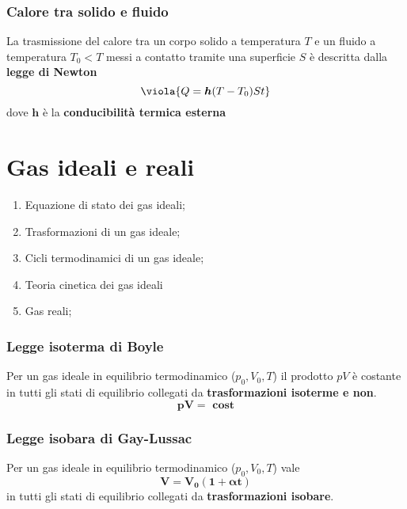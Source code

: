 \subsection{Calore tra solido e fluido}
La trasmissione del calore tra un corpo solido a temperatura \(T\) e un fluido a temperatura \(T_0 < T\) messi a contatto tramite una superficie \(S\) è descritta dalla \textbf{legge di Newton}
\begin{equation}
	\viola{Q = \boldsymbol{h}(T-T_0)St}
\end{equation}
dove \(\boldsymbol{h}\) è la \textbf{conducibilità termica esterna}

\newpage
\chapter{Gas ideali e reali}
\begin{es}{}
	\begin{enumerate}
		\item Equazione di stato dei gas ideali;
		\item Trasformazioni di un gas ideale;
		\item Cicli termodinamici di un gas ideale;
		\item Teoria cinetica dei gas ideali
		\item Gas reali;
	\end{enumerate}
\end{es}


\begin{center}
	\colorbox{yred}{\begin{minipage}{5.75in}
			\begin{redes}{}
				\subsection{Legge isoterma di Boyle}
				Per un gas ideale in equilibrio termodinamico (\(p_{0}, V_{0}, T\)) il prodotto \(pV\) è costante  in tutti gli stati di equilibrio collegati da \textbf{trasformazioni isoterme e non}.
				\[ 
				\boldsymbol{pV = \text{ cost}}
				\]
			\end{redes}
	\end{minipage}}
\end{center}

\begin{center}
	\colorbox{yred}{\begin{minipage}{5.75in}
			\begin{redes}{}
				\subsection{Legge isobara di Gay-Lussac}
				Per un gas ideale in equilibrio termodinamico (\(p_{0}, V_{0}, T\)) vale
				\[ 
				\boldsymbol{V = V_0(1 + \alpha t)}
				\]
				in tutti gli stati di equilibrio collegati da \textbf{trasformazioni isobare}.
			\end{redes}
	\end{minipage}}
\end{center}

